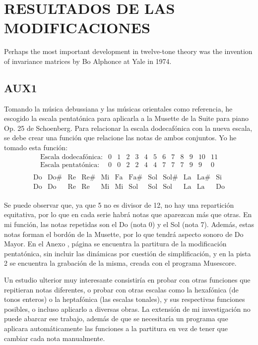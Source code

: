 	\chapter{RESULTADOS DE LAS MODIFICACIONES}
    Perhaps the most important development in twelve-tone theory was the
invention of invariance matrices by Bo Alphonce at Yale in 1974.
    
    
    \section{AUX1}
   
   	Tomando la música debussiana y las músicas orientales como referencia, he escogido la escala pentatónica para aplicarla a la Musette de la Suite para piano Op. 25 de Schoenberg. Para relacionar la escala dodecafónica con la nueva escala, se debe crear una función que relacione las notas de ambos conjuntos. Yo he tomado esta función:
   	$$\left.\begin{matrix}\text{Escala dodecafónica:}&0&1&2&3&4&5&6&7&8&9&10&11\\\text{Escala pentatónica:}&0&0&2&2&4&4&7&7&7&9&9&0\\\end{matrix}\right.$$
   	$$\left.\begin{matrix}\text{Do}&\text{Do\#}&\text{Re}&\text{Re\#}&\text{Mi}&\text{Fa}&\text{Fa\#}&\text{Sol}&\text{Sol\#}&\text{La}&\text{La\#}&\text{Si}\\\text{Do}&\text{Do}&\text{Re}&\text{Re}&\text{Mi}&\text{Mi}&\text{Sol}&\text{Sol}&\text{Sol}&\text{La}&\text{La}&\text{Do}\\\end{matrix}\right.$$
   	
   	Se puede observar que, ya que 5 no es divisor de 12, no hay una repartición equitativa, por lo que en cada serie habrá notas que aparezcan más que otras. En mi función, las notas repetidas son el Do (nota 0) y el Sol (nota 7). Además, estas notas forman el bordón de la Musette, por lo que tendrá aspecto sonoro de Do Mayor. En el Anexo , página  se encuentra la partitura de la modificación pentatónica, sin incluir las dinámicas por cuestión de simplificación, y en la pista 2 se encuentra la grabación de la misma, creada con el programa Musescore.
   	
   	Un estudio ulterior muy interesante consistiría en probar con otras funciones que repitieran notas diferentes, o probar con otras escalas como la hexafónica (de tonos enteros) o la heptafónica (las escalas tonales), y sus respectivas funciones posibles, o incluso aplicarlo a diversas obras. La extensión de mi investigación no puede abarcar ese trabajo, además de que se necesitaría un programa que aplicara automáticamente las funciones a la partitura en vez de tener que cambiar cada nota manualmente.
   	
